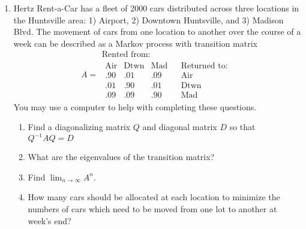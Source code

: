 \documentclass[11 pt]{article}
\begin{document}
\begin{enumerate}
\item Hertz Rent-a-Car has a fleet of 2000 cars distributed across three locations in the Huntsville area: 1) Airport, 2) Downtown Huntsville, and 3) Madison Blvd. The movement of cars from one location to another over the course of a week can be described as a Markov process with transition matrix
\[A = \begin{array}{c|c}
\text{Rented from:}\\
    \begin{array}{ccc} \text{Air} &\text{Dtwn} &\text{Mad}\\\hline
    .90 &.01 &.09\\
    .01 &.90 &.01\\
    .09 &.09 &.90
    \end{array} &\begin{array}{l} \text{Returned to:}\\\hline \text{Air}\\ \text{Dtwn} \\ \text{Mad} \end{array}
\end{array}\]
You may use a computer to help with completing these questions.
    \begin{enumerate}
    \item Find a diagonalizing matrix $Q$ and diagonal matrix $D$ so that $Q^{-1} A Q = D$
    \item What are the eigenvalues of the transition matrix?
    \item Find $\lim_{n \to \infty}A^n$.
    \item How many cars should be allocated at each location to minimize the numbers of cars which need to be moved from one lot to another at week's end?
    \end{enumerate}
\end{enumerate}
\end{document}
